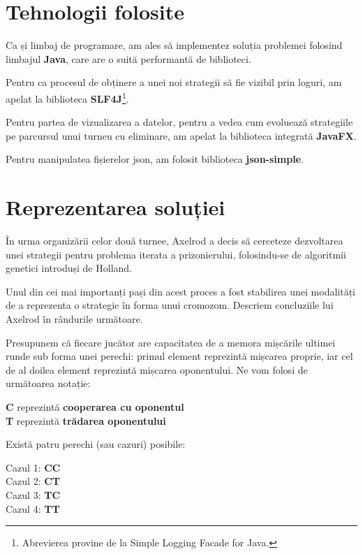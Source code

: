 \section{Tehnologii folosite}

Ca și limbaj de programare, am ales să implementez soluția problemei folosind limbajul \textbf{Java}, care are o suită performantă de biblioteci. 

Pentru ca procesul de obținere a unei noi strategii să fie vizibil prin loguri, am apelat la biblioteca \textbf{SLF4J}\cite{slf4j}\footnote{Abrevierea provine de la Simple Logging Facade for Java.}. 

Pentru partea de vizualizarea a datelor, pentru a vedea cum evoluează strategiile pe parcursul unui turneu cu eliminare, am apelat la biblioteca integrată \textbf{JavaFX}\cite{javaFX}. 

Pentru manipulatea fișierelor json, am folosit biblioteca \textbf{json-simple}\cite{json-simple}.  

\section{Reprezentarea soluției}

În urma organizării celor două turnee, Axelrod\cite{the_evolution_of_cooperation_axelrod} a decis să cerceteze dezvoltarea unei strategii pentru problema iterata a prizonierului, folosindu-se de algoritmii genetici introduși de Holland. 

Unul din cei mai importanți pași din acest proces a fost stabilirea unei modalități de a reprezenta o strategie în forma unui cromozom. Descriem concluziile lui Axelrod în rândurile următoare.

Presupunem că fiecare jucător are capacitatea de a memora mișcările ultimei runde sub forma unei perechi: primul element reprezintă mișcarea proprie, iar cel de al doilea element reprezintă mișcarea oponentului. Ne vom folosi de următoarea notație:

\begin{center}
	\textbf{C} reprezintă \textbf{cooperarea cu oponentul}\\
	\textbf{T} reprezintă \textbf{trădarea oponentului}  
\end{center}

Există patru perechi (sau cazuri) posibile:\\

\begin{center}
	Cazul 1: \textbf{CC}\\
	Cazul 2: \textbf{CT}\\
	Cazul 3: \textbf{TC}\\
	Cazul 4: \textbf{TT}\\
\end{center}

